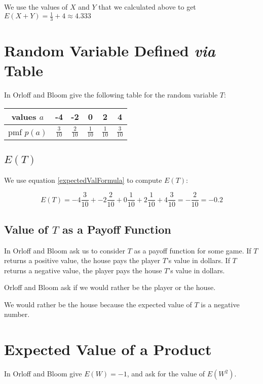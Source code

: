 \documentclass[a4paper,11pt]{article}
\begin{document}
We use the values of $X$ and $Y$ that we calculated above to get
$E \left( X + Y \right) = \frac{1}{3} + 4 \approx 4.333$

\section{Random Variable Defined \textit{via} Table}

In \cite{reading4bQ} Orloff and Bloom give the following table for the
random variable $T$:

\begin{center}
  \begin{tabular}{ | c | c | c | c | c |c |}
    \hline
    values $a$ & -4 & -2 & 0 & 2 & 4  \\ \hline
    pmf $p\left( a \right)$ & $\frac{3}{10}$ & $\frac{2}{10}$
      & $\frac{1}{10}$ & $\frac{1}{10}$ & $\frac{3}{10}$ \\ \hline
  \end{tabular}
\end{center}

\subsection{ $E \left( T \right)$}

We use equation \ref{expectedValFormula} to compute 
$E \left( T \right)$:

\begin{equation}
E \left( T \right) = -4 \frac{3}{10} + -2 \frac{2}{10} + 0 \frac{1}{10}
  + 2 \frac{1}{10} + 4 \frac{3}{10} = -\frac{2}{10} = -0.2
\end{equation}

\subsection{Value of $T$ as a Payoff Function}

In \cite{reading4bQ} Orloff and Bloom ask us to consider $T$ as a 
payoff function for some game.  If $T$ returns a positive value, the
house pays the player $T$'s value in dollars.  If $T$ returns a 
negative value, the player pays the house $T$'s value in dollars.

Orloff and Bloom ask if we would rather be the player or the house.

We would rather be the house because the expected value of $T$ is a
negative number.

\section{Expected Value of a Product}
In \cite{reading4bQ} Orloff and Bloom give $E \left( W \right) = -1$,
and ask for the value of $E \left( W^{2} \right)$.
\end{document}
